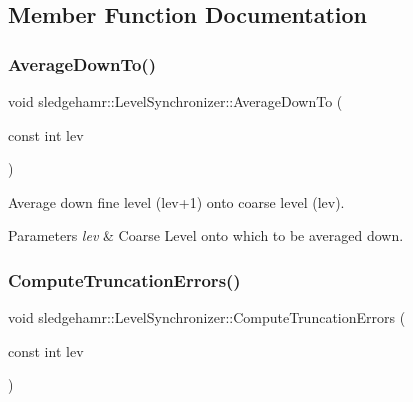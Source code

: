\subsection{Member Function Documentation}
\mbox{\label{classsledgehamr_1_1LevelSynchronizer_a8242eca3f0b55a87c5ea68b6d7ac6fdb}} 
\subsubsection{\texorpdfstring{Average\+Down\+To()}{AverageDownTo()}}
{\footnotesize\ttfamily void sledgehamr\+::\+Level\+Synchronizer\+::\+Average\+Down\+To (\begin{DoxyParamCaption}\item[{const int}]{lev }\end{DoxyParamCaption})}



Average down fine level (lev+1) onto coarse level (lev). 


\begin{DoxyParams}{Parameters}
{\em lev} & Coarse Level onto which to be averaged down. \\
\hline
\end{DoxyParams}
\mbox{\label{classsledgehamr_1_1LevelSynchronizer_a4798ce7632bccf7ad0f85818821510e5}} 
\subsubsection{\texorpdfstring{Compute\+Truncation\+Errors()}{ComputeTruncationErrors()}}
{\footnotesize\ttfamily void sledgehamr\+::\+Level\+Synchronizer\+::\+Compute\+Truncation\+Errors (\begin{DoxyParamCaption}\item[{const int}]{lev }\end{DoxyParamCaption})}



